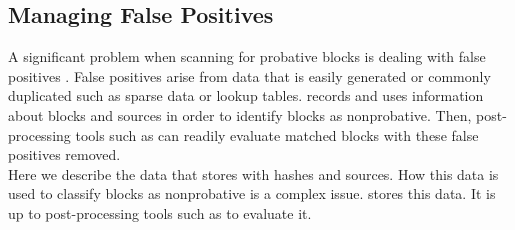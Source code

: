 \documentclass[11pt,fleqn]{article} %
\begin{document}
\subsection{Managing False Positives}
A significant problem when scanning for probative blocks is dealing with false positives \cite{hashBasedCarving}. False positives arise from data that is easily generated or commonly duplicated such as sparse data or lookup tables. \hdb records and uses information about blocks and sources in order to identify blocks as nonprobative. Then, post-processing tools such as \sscope can readily evaluate matched blocks with these false positives removed.\\

Here we describe the data that \hdb stores with hashes and sources. How this data is used to classify blocks as nonprobative is a complex issue. \hdb stores this data. It is up to post-processing tools such as \sscope to evaluate it.\\
\end{document}
